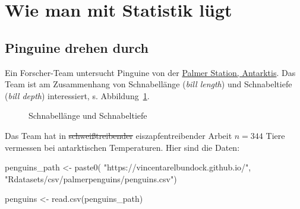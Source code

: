 \documentclass[
  a4paper,
]{scrbook}
\newenvironment{Shaded}{\begin{snugshade}}{\end{snugshade}}
\newcommand{\FunctionTok}[1]{\textcolor[rgb]{0.28,0.35,0.67}{#1}}
\newcommand{\NormalTok}[1]{\textcolor[rgb]{0.00,0.23,0.31}{#1}}
\newcommand{\OtherTok}[1]{\textcolor[rgb]{0.00,0.23,0.31}{#1}}
\newcommand{\StringTok}[1]{\textcolor[rgb]{0.13,0.47,0.30}{#1}}
\theoremstyle{definition}
\theoremstyle{definition}
\theoremstyle{definition}
\theoremstyle{remark}
\begin{document}
\section{Wie man mit Statistik
lügt}\label{wie-man-mit-statistik-luxfcgt-5}

\subsection{Pinguine drehen durch}\label{pinguine-drehen-durch}

Ein Forscher-Team untersucht Pinguine von der
\href{https://pallter.marine.rutgers.edu/}{Palmer Station, Antarktis}.
Das Team ist am Zusammenhang von Schnabellänge (\emph{bill length}) und
Schnabeltiefe (\emph{bill depth}) interessiert, s.
Abbildung~\ref{fig-peng-bill}.

\begin{figure}


\caption{\label{fig-peng-bill}Schnabellänge und Schnabeltiefe}

\end{figure}%

Das Team hat in \st{schweißtreibender} eiszapfentreibender Arbeit
\(n=344\) Tiere vermessen bei antarktischen Temperaturen. Hier sind die
Daten:

\begin{Shaded}
\begin{Highlighting}[]
\NormalTok{penguins\_path }\OtherTok{\textless{}{-}} \FunctionTok{paste0}\NormalTok{(}
  \StringTok{"https://vincentarelbundock.github.io/"}\NormalTok{,}
  \StringTok{"Rdatasets/csv/palmerpenguins/penguins.csv"}\NormalTok{)}

\NormalTok{penguins }\OtherTok{\textless{}{-}} \FunctionTok{read.csv}\NormalTok{(penguins\_path)}
\end{Highlighting}
\end{Shaded}
\end{document}
